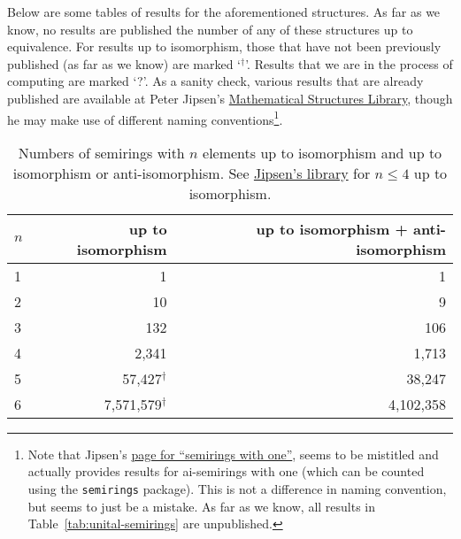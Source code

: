 \documentclass{article}
\theoremstyle{definition}
\theoremstyle{plain}
\begin{document}
Below are some tables of results for the aforementioned structures.
As far as we know, no results are published the number of any of
these structures up to equivalence. For results up to isomorphism,
those that have not been previously published (as far as we know) are
marked `$^\dagger$'. Results that we are in the process of computing
are marked `?'. As a sanity check, various results that are already
published are available at Peter Jipsen's
\href{https://math.chapman.edu/~jipsen/structures/doku.php?id=start}{Mathematical
Structures Library}, though he may make use of different naming
conventions\footnote{Note that Jipsen's
  \href{https://math.chapman.edu/~jipsen/structures/doku.php?id=semirings_with_identity\#finite_members}{page
  for ``semirings with one''}, seems to be mistitled and actually
  provides results for ai-semirings with one (which can be counted
  using the \texttt{semirings} package). This is not a difference in
  naming convention, but seems to just be a mistake. As far as we know,
all results in Table~\ref{tab:unital-semirings} are unpublished.}.
\begin{table}[ht]
  \centering
  \begin{tabular}{l|r|r}
    \toprule
    $n$ & up to isomorphism & up to isomorphism + anti-isomorphism \\
    \midrule
    1 & 1         & 1         \\
    2 & 10        & 9         \\
    3 & 132       & 106       \\
    4 & 2,341     & 1,713     \\
    5 & 57,427$^\dagger$    & 38,247    \\
    6 & 7,571,579$^\dagger$  & 4,102,358 \\
  \end{tabular}
  \caption{Numbers of semirings with $n$ elements up to isomorphism and up
    to isomorphism or anti-isomorphism. See
    \href{https://math.chapman.edu/~jipsen/structures/doku.php?id=semirings\#finite_members}{Jipsen's
  library} for \(n\leq4\) up to isomorphism.}
  \label{tab:semirings}
\end{table}
\end{document}
